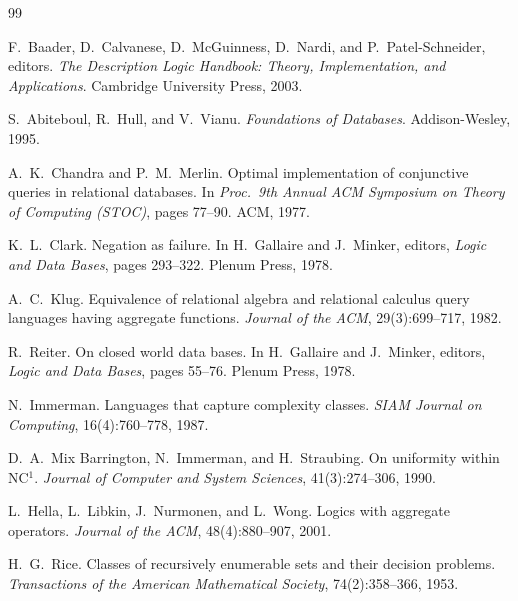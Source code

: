 \documentclass[11pt, a4paper]{article}
\theoremstyle{plain}
\theoremstyle{definition}
\theoremstyle{remark}
\begin{document}
\begin{thebibliography}{99}

F.~Baader, D.~Calvanese, D.~McGuinness, D.~Nardi, and P.~Patel-Schneider, editors.
\newblock \emph{The Description Logic Handbook: Theory, Implementation, and
  Applications}.
\newblock Cambridge University Press, 2003.

S.~Abiteboul, R.~Hull, and V.~Vianu.
\newblock \emph{Foundations of Databases}.
\newblock Addison-Wesley, 1995.


A.~K.~Chandra and P.~M.~Merlin.
\newblock Optimal implementation of conjunctive queries in relational databases.
\newblock In \emph{Proc.\ 9th Annual ACM Symposium on Theory of Computing
  (STOC)}, pages 77--90. ACM, 1977.

K.~L.~Clark.
\newblock Negation as failure.
\newblock In H.~Gallaire and J.~Minker, editors, \emph{Logic and Data Bases},
  pages 293--322. Plenum Press, 1978.


A.~C.~Klug.
\newblock Equivalence of relational algebra and relational calculus query
  languages having aggregate functions.
\newblock \emph{Journal of the ACM}, 29(3):699--717, 1982.


R.~Reiter.
\newblock On closed world data bases.
\newblock In H.~Gallaire and J.~Minker, editors, \emph{Logic and Data Bases},
  pages 55--76. Plenum Press, 1978.

N.~Immerman.
\newblock Languages that capture complexity classes.
\newblock \emph{SIAM Journal on Computing}, 16(4):760--778, 1987.

D.~A.~Mix Barrington, N.~Immerman, and H.~Straubing.
\newblock On uniformity within {NC}$^1$.
\newblock \emph{Journal of Computer and System Sciences}, 41(3):274--306, 1990.

L.~Hella, L.~Libkin, J.~Nurmonen, and L.~Wong.
\newblock Logics with aggregate operators.
\newblock \emph{Journal of the ACM}, 48(4):880--907, 2001.

H.~G.~Rice.
\newblock Classes of recursively enumerable sets and their decision problems.
\newblock \emph{Transactions of the American Mathematical Society},
  74(2):358--366, 1953.


\end{thebibliography}
\end{document}
